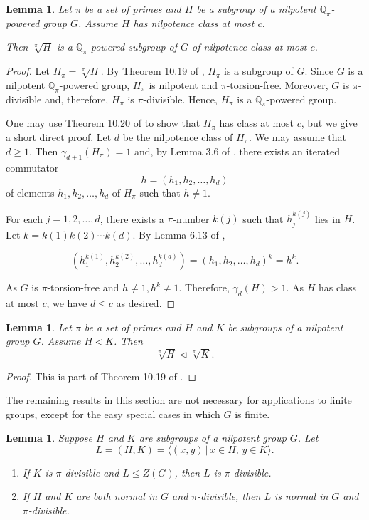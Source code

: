 \documentclass[mathscr]{amsart}
\theoremstyle{theorem}
\newtheorem{lemma}[theorem]{Lemma}
\theoremstyle{definition}
\numberwithin{equation}{section}
\def \({\left(}
\def \){\right)}
\begin{document}
\begin{lemma}\label{lemma2.2-3-24}
Let $\pi$ be a set of primes and $H$ be a subgroup of a nilpotent
\newline$\mathbb{Q}_\pi$-powered group $G$.  Assume $H$ has
nilpotence class at most $c$.

Then $\sqrt[\pi]{H}$ is a $\mathbb{Q}_\pi$-powered subgroup of $G$
of nilpotence class at most $c$.
\end{lemma}

\begin{proof}
Let $H_\pi=\sqrt[\pi]{H}$. By Theorem 10.19 of \cite{Kh}, $H_\pi$ is
a subgroup of $G$. Since $G$ is a nilpotent $\mathbb{Q}_\pi$-powered
group, $H_\pi$ is nilpotent and $\pi$-torsion-free.  Moreover, $G$
is $\pi$-divisible and, therefore, $H_\pi$ is $\pi$-divisible.
Hence, $H_\pi$ is a $\mathbb{Q}_\pi$-powered group.

One may use Theorem 10.20 of \cite{Kh} to show that $H_\pi$ has
class at most $c$, but we give a short direct proof.  Let $d$ be the
nilpotence class of $H_\pi$.  We may assume that $d\geq 1$.  Then
$\gamma_{d+1}\(H_\pi\)=1$ and, by Lemma 3.6 of \cite{Kh}, there
exists an iterated commutator
$$
h=\(h_1,h_2,\dots,h_d\)
$$
of elements $h_1,h_2,\dots,h_d$ of $H_\pi$ such that $h\neq 1$.

For each $j=1,2,\dots,d$, there exists a $\pi$-number $k(j)$ such
that $h_j^{k(j)}$ lies in $H$.  Let $k=k(1)k(2)\cdots k(d)$. By
Lemma 6.13 of \cite{Kh},

$$
\(h_1^{k(1)},h_2^{k(2)},\dots,h_d^{k(d)}\)=\(h_1,h_2,\dots,h_d\)^k=h^k.
$$


As $G$ is $\pi$-torsion-free and $h\neq 1,h^k\neq 1$.  Therefore,
$\gamma_d(H)>1$.  As $H$ has class at most $c$, we have $d\leq c$ as
desired.
\end{proof}

\begin{lemma}\label{lemma2.3-3-24}
Let $\pi$ be a set of primes and $H$ and $K$ be subgroups of a
nilpotent group $G$.  Assume $H\lhd K$.  Then
$$
\sqrt[\pi]{H}\lhd\sqrt[\pi]{K}.
$$
\end{lemma}

\begin{proof}
This is part of Theorem 10.19 of \cite{Kh}.
\end{proof}

The remaining results in this section are not necessary for
applications to finite groups, except for the easy special cases in
which $G$ is finite.

\begin{lemma}\label{lemma2.4-3-24}
Suppose $H$ and $K$ are subgroups of a nilpotent group $G$.  Let
$$
L=(H,K)=\langle (x,y)\,|\,x\in H,\,y\in K\rangle.
$$
\begin{enumerate}
\item[(a)] If $K$ is $\pi$-divisible and $L\leq Z(G)$, then $L$ is
$\pi$-divisible.
\item[(b)] If $H$ and $K$ are both normal in $G$ and
$\pi$-divisible, then $L$ is normal in $G$ and $\pi$-divisible.
\end{enumerate}
\end{lemma}
\end{document}
